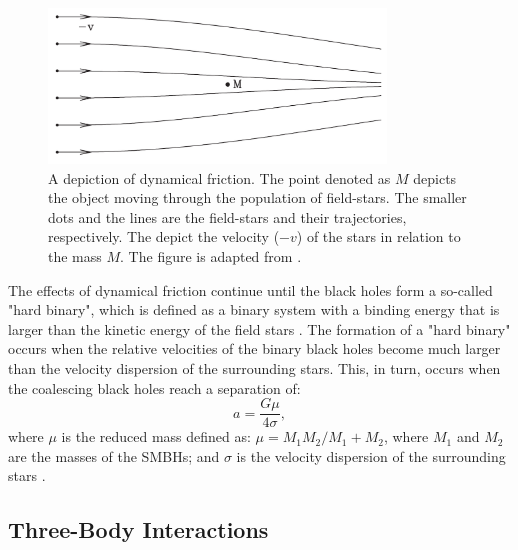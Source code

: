 \documentclass[english, twoside]{HYgradu}
\begin{document}
\begin{figure}
	\centering
	\includegraphics[width=0.8\textwidth]{mo_dynamical_friction.png}
	\caption{A depiction of dynamical friction. The point denoted as $M$ depicts the object moving through the population of field-stars. The smaller dots and the lines are the field-stars and their trajectories, respectively. The depict the velocity ($-v$) of the stars in relation to the mass $M$. The figure is adapted from \cite{GalaxyFormationAndEvo2010}.}
	\label{figure:dynamical_friction}
\end{figure}

The effects of dynamical friction continue until the black holes form a so-called "hard binary", which is defined as a binary system with a binding energy that is larger than the kinetic energy of the field stars \citep{BinneyTremaine}. The formation of a "hard binary" occurs when the relative velocities of the binary black holes become much larger than the velocity dispersion of the surrounding stars. This, in turn, occurs when the coalescing black holes reach a separation of:
\begin{equation}
a = \frac{G\mu}{4\sigma},
\end{equation}
where $\mu$ is the reduced mass defined as: $\mu = M_1M_2 / M_1 + M_2$, where $M_1$ and $M_2$ are the masses of the SMBHs; and $\sigma$ is the velocity dispersion of the surrounding stars \citep{MerrittBook}.

\subsection{Three-Body Interactions} \label{section:three-body}
\end{document}
